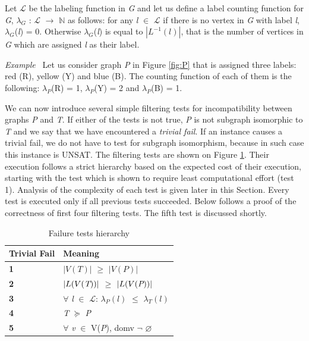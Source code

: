 \documentclass{l4proj}
\newcounter{example}[section]
\newenvironment{example}[1][]{\refstepcounter{example}\par\medskip
   \noindent \textit{Example~\theexample #1} \rmfamily}{\medskip}
\newcommand{\Lagr}{\mathcal{L}}
\begin{document}
Let $\Lagr$ be the labeling function in \emph{G} and let us define a label counting function for \emph{G}, $\lambda_{G}$ : $\Lagr$ $\rightarrow$ $\mathbb{N}$ as follows:
for any \emph{l} $\in$ $\Lagr$ if there is no vertex in \emph{G} with label \emph{l}, $\lambda_{G}$(\emph{l}) = 0. Otherwise $\lambda_{G}$(\emph{l}) is equal to $|L^{-1}(l)|$, that is the number of vertices in \emph{G} which are assigned \emph{l} as their label.

\begin{example}
Let us consider graph \emph{P} in Figure \ref{fig:P} that is assigned three labels: red (R), yellow (Y) and blue (B). The counting function of each of them is the following: $\lambda_{P}$(R) = 1, $\lambda_{P}$(Y) = 2 and $\lambda_{P}$(B) = 1.
\end{example}

We can now introduce several simple filtering tests for incompatibility between graphs \emph{P} and \emph{T}. If either of the tests is not true, \emph{P} is not subgraph isomorphic to \emph{T} and we say that we have encountered a \emph{trivial fail}. If an instance causes a trivial fail, we do not have to test for subgraph isomorphism, because in such case this instance is UNSAT. The filtering tests are shown on Figure \ref{table:failures}. Their execution follows a strict hierarchy based on the expected cost of their execution, starting with the test which is shown to require least computational effort (test 1). Analysis of the complexity of each test is given later in this Section. Every test is executed only if all previous tests succeeded. Below follows a proof of the correctness of first four filtering tests. The fifth test is discussed shortly. 

\begin{table}[H]
\centering
\renewcommand{\arraystretch}{1.5}%
\begin{tabular}{ >{\centering\bfseries}m{1in} >{\centering\arraybackslash}m{2.3in}} 
\toprule
  Trivial Fail & Meaning\\
\midrule
 \textbf{1} & $|V (T)|$ $\geq$ $|V (P)|$\\
 \rowcolor{Gray}
 \textbf{2} & $|L(V(\emph{T}))|$ $\geq$ $|L(V(\emph{P}))|$\\
 \textbf{3} & $\forall$ \emph{l} $\in$ $\Lagr$: $\lambda_{P}(l)$ $\leq$ $\lambda_{T}(l)$\\
 \rowcolor{Gray}
 \textbf{4} & \emph{T} $\succeq$ \emph{P}\\
 \textbf{5} & $\forall$ \emph{v} $\in$ V(\emph{P}), domv $\neg$  $\varnothing$\\
 \bottomrule
\end{tabular}
\caption{Failure tests hierarchy}
\label{table:failures}
\end{table}        
\end{document}
